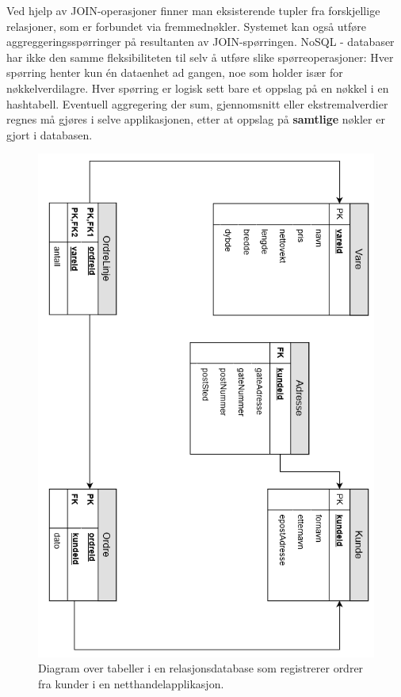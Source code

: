 Ved hjelp av JOIN-operasjoner finner man eksisterende tupler fra forskjellige relasjoner, som er forbundet via fremmednøkler. Systemet kan også utføre aggreggeringsspørringer på resultanten av JOIN-spørringen. NoSQL - databaser har ikke den samme fleksibiliteten til selv å utføre slike spørreoperasjoner: Hver spørring henter kun én dataenhet ad gangen, noe som holder især for nøkkelverdilagre. Hver spørring er logisk sett bare et oppslag på en nøkkel i en hashtabell. Eventuell aggregering der sum, gjennomsnitt eller ekstremalverdier regnes må gjøres i selve applikasjonen, etter at oppslag på \textbf{samtlige} nøkler er gjort i databasen. %

\begin{figure}[!ht]
    \centering
    \includegraphics[scale=0.7]{fig/NettbutikkOrdreModell.png}
    \caption{Diagram over tabeller i en relasjonsdatabase som registrerer ordrer fra kunder i en netthandelapplikasjon.}
    \label{fig1}
\end{figure}
 
